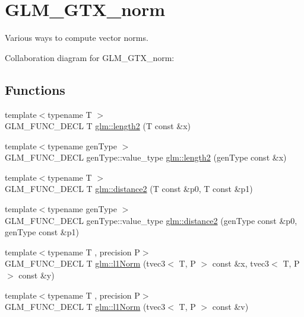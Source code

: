 \hypertarget{group__gtx__norm}{\section{G\-L\-M\-\_\-\-G\-T\-X\-\_\-norm}
\label{group__gtx__norm}
}


Various ways to compute vector norms.  


Collaboration diagram for G\-L\-M\-\_\-\-G\-T\-X\-\_\-norm\-:
\subsection*{Functions}
\begin{DoxyCompactItemize}
\item 
{\footnotesize template$<$typename T $>$ }\\G\-L\-M\-\_\-\-F\-U\-N\-C\-\_\-\-D\-E\-C\-L T \hyperlink{group__gtx__norm_ga08c670024cd230e22f8b853f185ff533}{glm\-::length2} (T const \&x)
\item 
{\footnotesize template$<$typename gen\-Type $>$ }\\G\-L\-M\-\_\-\-F\-U\-N\-C\-\_\-\-D\-E\-C\-L gen\-Type\-::value\-\_\-type \hyperlink{group__gtx__norm_gaa279ba7fdecbed3f9f2b60502b7ec8ca}{glm\-::length2} (gen\-Type const \&x)
\item 
{\footnotesize template$<$typename T $>$ }\\G\-L\-M\-\_\-\-F\-U\-N\-C\-\_\-\-D\-E\-C\-L T \hyperlink{group__gtx__norm_ga3544f6288d3bce2cf2a9f6ebe39e0557}{glm\-::distance2} (T const \&p0, T const \&p1)
\item 
{\footnotesize template$<$typename gen\-Type $>$ }\\G\-L\-M\-\_\-\-F\-U\-N\-C\-\_\-\-D\-E\-C\-L gen\-Type\-::value\-\_\-type \hyperlink{group__gtx__norm_gaec2d9df62436879b48207d39516f3788}{glm\-::distance2} (gen\-Type const \&p0, gen\-Type const \&p1)
\item 
{\footnotesize template$<$typename T , precision P$>$ }\\G\-L\-M\-\_\-\-F\-U\-N\-C\-\_\-\-D\-E\-C\-L T \hyperlink{group__gtx__norm_gaebe5a39b06e262e615622129f37da4f4}{glm\-::l1\-Norm} (tvec3$<$ T, P $>$ const \&x, tvec3$<$ T, P $>$ const \&y)
\item 
{\footnotesize template$<$typename T , precision P$>$ }\\G\-L\-M\-\_\-\-F\-U\-N\-C\-\_\-\-D\-E\-C\-L T \hyperlink{group__gtx__norm_ga6d5964f09cdb43803496a5ee3ced71cb}{glm\-::l1\-Norm} (tvec3$<$ T, P $>$ const \&v)

\end{DoxyCompactItemize}
